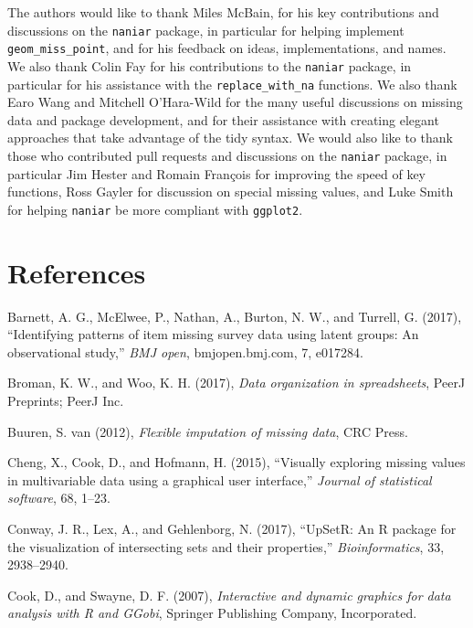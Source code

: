 \documentclass[]{article}
\theoremstyle{definition}
\theoremstyle{definition}
\theoremstyle{definition}
\theoremstyle{remark}
\begin{document}
The authors would like to thank Miles McBain, for his key contributions
and discussions on the \texttt{naniar} package, in particular for
helping implement \texttt{geom\_miss\_point}, and for his feedback on
ideas, implementations, and names. We also thank Colin Fay for his
contributions to the \texttt{naniar} package, in particular for his
assistance with the \texttt{replace\_with\_na} functions. We also thank
Earo Wang and Mitchell O'Hara-Wild for the many useful discussions on
missing data and package development, and for their assistance with
creating elegant approaches that take advantage of the tidy syntax. We
would also like to thank those who contributed pull requests and
discussions on the \texttt{naniar} package, in particular Jim Hester and
Romain François for improving the speed of key functions, Ross Gayler
for discussion on special missing values, and Luke Smith for helping
\texttt{naniar} be more compliant with \texttt{ggplot2}.

\hypertarget{references}{%
\section*{References}\label{references}}

\hypertarget{refs}{}
\leavevmode\hypertarget{ref-Barnett2017}{}%
Barnett, A. G., McElwee, P., Nathan, A., Burton, N. W., and Turrell, G.
(2017), ``Identifying patterns of item missing survey data using latent
groups: An observational study,'' \emph{BMJ open}, bmjopen.bmj.com, 7,
e017284.

\leavevmode\hypertarget{ref-Broman2017}{}%
Broman, K. W., and Woo, K. H. (2017), \emph{Data organization in
spreadsheets}, PeerJ Preprints; PeerJ Inc.

\leavevmode\hypertarget{ref-VanBuuren2012}{}%
Buuren, S. van (2012), \emph{Flexible imputation of missing data}, CRC
Press.

\leavevmode\hypertarget{ref-Cheng2015}{}%
Cheng, X., Cook, D., and Hofmann, H. (2015), ``Visually exploring
missing values in multivariable data using a graphical user interface,''
\emph{Journal of statistical software}, 68, 1--23.

\leavevmode\hypertarget{ref-Conway2017}{}%
Conway, J. R., Lex, A., and Gehlenborg, N. (2017), ``UpSetR: An R
package for the visualization of intersecting sets and their
properties,'' \emph{Bioinformatics}, 33, 2938--2940.

\leavevmode\hypertarget{ref-Cook2007}{}%
Cook, D., and Swayne, D. F. (2007), \emph{Interactive and dynamic
graphics for data analysis with R and GGobi}, Springer Publishing
Company, Incorporated.
\end{document}
